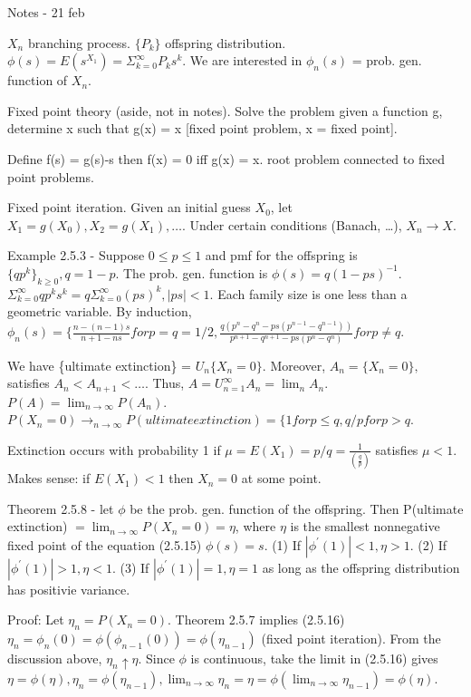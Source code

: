 \documentclass{article}
\begin{document}
Notes - 21 feb

$X_n$ branching process. $\{P_k\}$ offspring distribution. $\phi(s) = E(s^{X_1}) = \Sigma_{k=0}^{\infty}P_k s^k$. We are interested in $\phi_n(s)$ = prob. gen. function of $X_n$.

Fixed point theory (aside, not in notes). Solve the problem given a function g, determine x such that g(x) = x [fixed point problem, x = fixed point].

Define f(s) = g(s)-s then f(x) = 0 iff g(x) = x. root problem connected to fixed point problems.

Fixed point iteration. Given an initial guess $X_0$, let $X_1 = g(X_0), X_2 = g(X_1), \dots$. Under certain conditions (Banach, \dots), $X_n \rightarrow X$.

Example 2.5.3 - Suppose $0 \le p \le 1$ and pmf for the offspring is $\{q p^k\}_{k \ge 0}, q = 1-p$. The prob. gen. function is $\phi(s) = q(1-ps)^{-1}$. $\Sigma_{k=0}^{\infty} q p^k s^k = q \Sigma_{k=0}^{\infty} (ps)^k, |ps| < 1$. Each family size is one less than a geometric variable. By induction, $\phi_n(s) = \{ \frac{n-(n-1)s}{n + 1 - ns} for p = q = 1/2, \frac{q(p^n - q^n - ps (p^{n-1}-q^{n-1}))}{p^{n+1}-q^{n+1}-ps(p^n-q^n)} for p \ne q$.

We have \{ultimate extinction\} = $U_n \{X_n = 0\}$. Moreover, $A_n = \{X_n=0\},$ satisfies $A_n < A_{n+1} < \dots$. Thus, $A = U_{n=1}^{\infty} A_n = \lim_n A_n$. $P(A) = \lim_{n \rightarrow \infty} P(A_n)$. $P(X_n=0) \rightarrow_{n \rightarrow \infty} P(ultimate extinction) = \{ 1 for p \le q, q/p for p > q$.

Extinction occurs with probability 1 if $\mu = E(X_1) = p/q = \frac{1}{(\frac{q}{p})}$ satisfies $\mu < 1$. Makes sense: if $E(X_1) < 1$ then $X_n = 0$ at some point.

Theorem 2.5.8 - let $\phi$ be the prob. gen. function of the offspring. Then P(ultimate extinction) $= \lim_{n \rightarrow \infty} P(X_n = 0) = \eta$, where $\eta$ is the smallest nonnegative fixed point of the equation (2.5.15) $\phi(s) = s$. (1) If $|\phi^\prime (1)| < 1, \eta > 1$. (2) If $|\phi^\prime(1)| > 1, \eta < 1$. (3) If $|\phi^\prime(1)| = 1, \eta = 1$ as long as the offspring distribution has positivie variance.

Proof: Let $\eta_n = P(X_n=0)$. Theorem 2.5.7 implies (2.5.16) $\eta_n = \phi_n(0) = \phi(\phi_{n-1}(0)) = \phi(\eta_{n-1})$ (fixed point iteration). From the discussion above, $\eta_n \uparrow \eta$. Since $\phi$ is continuous, take the limit in (2.5.16) gives $\eta = \phi(\eta), \eta_n = \phi(\eta_{n-1}), \lim_{n \rightarrow \infty} \eta_n = \eta = \phi(\lim_{n \rightarrow \infty} \eta_{n-1}) = \phi(\eta)$.
\end{document}
